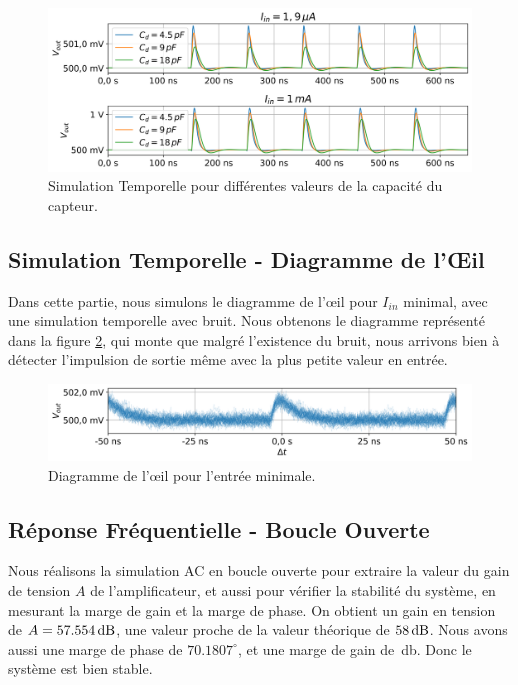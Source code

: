\documentclass[a4paper,12pt]{article}
\numberwithin{equation}{section}
\renewcommand{\ang}[1]{\ensuremath{\num{#1}^\circ}}
\newcommand{\?}{\stackrel{?}{=}}
\newcommand{\sis}[2]{\complexnum{#1}\,\si[per-mode=symbol]{#2}}
\begin{document}
\begin{figure}[htp!]
    \centering
    \includegraphics[width=\linewidth]{images/tran_cd_sweep.png}
    \caption{Simulation Temporelle pour différentes valeurs de la capacité du capteur.}
    \label{fig:tran_cd_sweep}
\end{figure}

\subsection{Simulation Temporelle - Diagramme de l'Œil}

Dans cette partie, nous simulons le diagramme de l'œil pour $I_{in}$ minimal, avec une simulation temporelle avec bruit. Nous obtenons le diagramme représenté dans la figure \ref{fig:eye_diagram}, qui monte que malgré l'existence du bruit, nous arrivons bien à détecter l'impulsion de sortie même avec la plus petite valeur en entrée.

\begin{figure}[htp!]
    \centering
    \includegraphics[width=\linewidth]{images/eye_diagram.png}
    \caption{Diagramme de l'œil pour l'entrée minimale.}
    \label{fig:eye_diagram}
\end{figure}


\subsection{Réponse Fréquentielle - Boucle Ouverte}

Nous réalisons la simulation AC en boucle ouverte pour extraire la valeur du gain de tension $A$ de l'amplificateur, et aussi pour vérifier la stabilité du système, en mesurant la marge de gain et la marge de phase. On obtient un gain en tension de $A=\sis{57.554}{\decibel}$, une valeur proche de la valeur théorique de $\sis{58}{\decibel}$. Nous avons aussi une marge de phase de \ang{70.1807}, et une marge de gain de \sis{18.6734}{\decibel}. Donc le système est bien stable.
\end{document}
